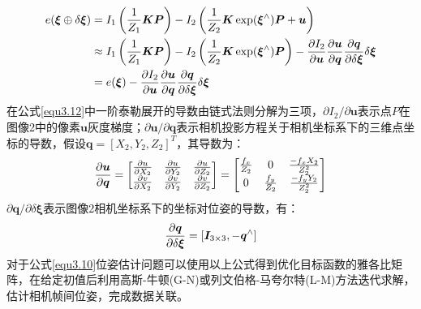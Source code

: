 \begin{equation}
\label{equ3.12}
\begin{aligned}
e(\boldsymbol{\xi}\oplus \delta \boldsymbol{\xi}) &= I_1\left({1 \over Z_1} \boldsymbol{K} \boldsymbol{P} \right) - I_2 \left({1 \over Z_2} \boldsymbol{K} \exp (\boldsymbol{\xi}^{\wedge}) \boldsymbol{P}+ \boldsymbol{u} \right) 
\\ 
& \approx I_1\left({1 \over Z_1} \boldsymbol{K} \boldsymbol{P} \right) - I_2 \left({1 \over Z_2} \boldsymbol{K} \exp (\boldsymbol{\xi}^{\wedge}) \boldsymbol{P} \right) - {\partial I_2 \over \partial \boldsymbol{u}} {\partial \boldsymbol{u} \over \partial \boldsymbol{q}} {\partial \boldsymbol{q} \over \partial \delta \boldsymbol{\xi}} \delta \boldsymbol{\xi}
\\
& = e(\boldsymbol{\xi}) - {\partial I_2 \over \partial \boldsymbol{u}} {\partial \boldsymbol{u} \over \partial \boldsymbol{q}} {\partial \boldsymbol{q} \over \partial \delta \boldsymbol{\xi}} \delta \boldsymbol{\xi}
\end{aligned}
\end{equation}
在公式\eqref{equ3.12}中一阶泰勒展开的导数由链式法则分解为三项，$\partial I_2 / \partial \boldsymbol{u}$表示点$P$在图像2中的像素$\boldsymbol{u}$灰度梯度；$\partial \boldsymbol{u} / \partial \boldsymbol{q}$表示相机投影方程关于相机坐标系下的三维点坐标的导数，假设$\boldsymbol{q} = \left[X_2,Y_2,Z_2 \right]^T$，其导数为：
\begin{equation}
\label{equ3.13}
{ \partial \boldsymbol{u} \over \partial \boldsymbol{q} } = 
\begin{bmatrix}
\partial u \over \partial X_2 & \partial u \over \partial Y_2 & \partial u \over \partial Z_2 \cr
\partial v \over \partial X_2 & \partial v \over \partial Y_2 & \partial v \over \partial Z_2 \cr
\end{bmatrix} = 
\begin{bmatrix}
f_x \over Z_2 & 0 & -f_x X_2 \over Z_2^2 \cr
0 & f_y \over Z_2 & - f_y Y_2 \over Z_2^2 \cr
\end{bmatrix}
\end{equation}
${\partial \boldsymbol{q} / \partial \delta \boldsymbol{\xi}}$表示图像2相机坐标系下的坐标对位姿的导数，有：
\begin{equation}
\label{equ3.14}
{\partial \boldsymbol{q} \over \partial \delta \boldsymbol{\xi}} = \left[\boldsymbol{I}_{3\times 3},-\boldsymbol{q}^{\wedge} \right]
\end{equation}
对于公式\eqref{equ3.10}位姿估计问题可以使用以上公式得到优化目标函数的雅各比矩阵，在给定初值后利用高斯-牛顿(G-N)或列文伯格-马夸尔特(L-M)方法迭代求解，估计相机帧间位姿，完成数据关联。




